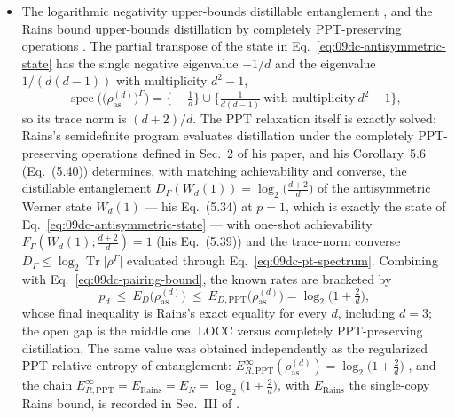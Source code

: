 \begin{itemize}
  \item The logarithmic negativity upper-bounds distillable entanglement
  , and the Rains bound
  upper-bounds distillation by completely PPT-preserving operations
  .  The partial transpose of the state
  in Eq.~\eqref{eq:09dc-antisymmetric-state} has the single negative
  eigenvalue $-1/d$ and the eigenvalue $1/(d(d-1))$ with multiplicity
  $d^2-1$,
  \begin{equation}
    \operatorname{spec}\bigl(\bigl(\rho_{\mathrm{as}}^{(d)}\bigr)^{\Gamma}\bigr)
    =\bigl\{-\tfrac1d\bigr\}\cup\bigl\{\tfrac{1}{d(d-1)}\ \text{with
    multiplicity}\ d^2-1\bigr\},
    \label{eq:09dc-pt-spectrum}
  \end{equation}
  so its trace norm is $(d+2)/d$.  The PPT relaxation itself is exactly
  solved: Rains's semidefinite program evaluates distillation under the
  completely PPT-preserving operations defined in Sec.~2 of his paper, and
  his Corollary~5.6 (Eq.~(5.40)) determines, with matching achievability
  and converse, the distillable entanglement
  $D_\Gamma(W_d(1))=\log_2\bigl(\frac{d+2}{d}\bigr)$ of the antisymmetric
  Werner state $W_d(1)$ --- his Eq.~(5.34) at $p=1$, which is exactly the
  state of Eq.~\eqref{eq:09dc-antisymmetric-state} --- with one-shot
  achievability $F_\Gamma(W_d(1);\frac{d+2}{d})=1$ (his Eq.~(5.39)) and the
  trace-norm converse $D_\Gamma\le
  \log_2\operatorname{Tr}\lvert\rho^\Gamma\rvert$ evaluated through
  Eq.~\eqref{eq:09dc-pt-spectrum}.  Combining with
  Eq.~\eqref{eq:09dc-pairing-bound}, the known rates are bracketed by
  \begin{equation}
    p_d\ \le\ E_D\bigl(\rho_{\mathrm{as}}^{(d)}\bigr)\ \le\
    E_{D,\mathrm{PPT}}\bigl(\rho_{\mathrm{as}}^{(d)}\bigr)
    =\log_2\bigl(1+\tfrac2d\bigr),
    \label{eq:09dc-bracket}
  \end{equation}
  whose final inequality is Rains's exact equality for every $d$, including
  $d=3$; the open gap is the middle one, LOCC versus completely
  PPT-preserving distillation.  The same value was obtained independently
  as the regularized PPT relative entropy of entanglement:
  $E_{R,\mathrm{PPT}}^{\infty}(\rho_{\mathrm{as}}^{(d)})
  =\log_2\bigl(1+\tfrac2d\bigr)$
  , and the chain
  $E_{R,\mathrm{PPT}}^{\infty}=E_{\mathrm{Rains}}=E_N
  =\log_2\bigl(1+\tfrac2d\bigr)$, with $E_{\mathrm{Rains}}$ the single-copy
  Rains bound, is recorded in Sec.~III of
  .


\end{itemize}
